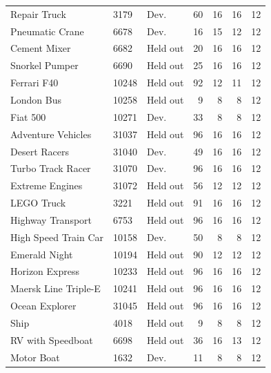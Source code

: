 \begin{longtable}{p{}llrrrr}
Repair Truck & 3179 & Dev. & 60 & 16 & 16 & 12\\
Pneumatic Crane & 6678 & Dev. & 16 & 15 & 12 & 12\\
Cement Mixer & 6682 & Held out & 20 & 16 & 16 & 12\\
Snorkel Pumper & 6690 & Held out & 25 & 16 & 16 & 12\\
Ferrari F40 & 10248 & Held out & 92 & 12 & 11 & 12\\
London Bus & 10258 & Held out & 9 & 8 & 8 & 12\\
Fiat 500 & 10271 & Dev. & 33 & 8 & 8 & 12\\
Adventure Vehicles & 31037 & Held out & 96 & 16 & 16 & 12\\
Desert Racers & 31040 & Dev. & 49 & 16 & 16 & 12\\
Turbo Track Racer & 31070 & Dev. & 96 & 16 & 16 & 12\\
Extreme Engines & 31072 & Held out & 56 & 12 & 12 & 12\\
LEGO Truck & 3221 & Held out & 91 & 16 & 16 & 12\\
Highway Transport & 6753 & Held out & 96 & 16 & 16 & 12\\
High Speed Train Car & 10158 & Dev. & 50 & 8 & 8 & 12\\
Emerald Night & 10194 & Held out & 90 & 12 & 12 & 12\\
Horizon Express & 10233 & Held out & 96 & 16 & 16 & 12\\
Maersk Line Triple-E & 10241 & Held out & 96 & 16 & 16 & 12\\
Ocean Explorer & 31045 & Held out & 96 & 16 & 16 & 12\\
Ship & 4018 & Held out & 9 & 8 & 8 & 12\\
RV with Speedboat & 6698 & Held out & 36 & 16 & 13 & 12\\
Motor Boat & 1632 & Dev. & 11 & 8 & 8 & 12\\
\end{longtable}
